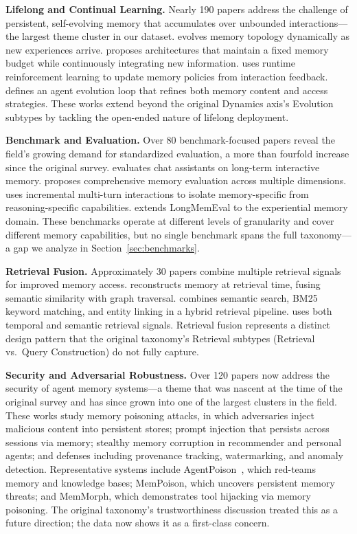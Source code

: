 \textbf{Lifelong and Continual Learning.} Nearly 190 papers address the challenge of persistent, self-evolving memory that accumulates over unbounded interactions---the largest theme cluster in our dataset. \citet{Unknown2026AllMem} evolves memory topology dynamically as new experiences arrive. \citet{Unknown2026ContinuumMemoryArchi} proposes architectures that maintain a fixed memory budget while continuously integrating new information. \citet{Unknown2026MemRL} uses runtime reinforcement learning to update memory policies from interaction feedback. \citet{Unknown2025AgentEvolver} defines an agent evolution loop that refines both memory content and access strategies. These works extend beyond the original Dynamics axis's Evolution subtypes by tackling the open-ended nature of lifelong deployment.

\textbf{Benchmark and Evaluation.} Over 80 benchmark-focused papers reveal the field's growing demand for standardized evaluation, a more than fourfold increase since the original survey. \citet{Wu2024LongMemEval} evaluates chat assistants on long-term interactive memory. \citet{Tan2025MemBench} proposes comprehensive memory evaluation across multiple dimensions. \citet{Unknown2025MemoryAgentBench} uses incremental multi-turn interactions to isolate memory-specific from reasoning-specific capabilities. \citet{Unknown2026LongMemEvalV2} extends LongMemEval to the experiential memory domain. These benchmarks operate at different levels of granularity and cover different memory capabilities, but no single benchmark spans the full taxonomy---a gap we analyze in Section~\ref{sec:benchmarks}.

\textbf{Retrieval Fusion.} Approximately 30 papers combine multiple retrieval signals for improved memory access. \citet{Unknown2026MRAgent} reconstructs memory at retrieval time, fusing semantic similarity with graph traversal. \citet{Unknown2025Mem0} combines semantic search, BM25 keyword matching, and entity linking in a hybrid retrieval pipeline. \citet{Unknown2026Engram} uses both temporal and semantic retrieval signals. Retrieval fusion represents a distinct design pattern that the original taxonomy's Retrieval subtypes (Retrieval vs.\ Query Construction) do not fully capture.

\textbf{Security and Adversarial Robustness.} Over 120 papers now address the security of agent memory systems---a theme that was nascent at the time of the original survey and has since grown into one of the largest clusters in the field. These works study memory poisoning attacks, in which adversaries inject malicious content into persistent stores; prompt injection that persists across sessions via memory; stealthy memory corruption in recommender and personal agents; and defenses including provenance tracking, watermarking, and anomaly detection. Representative systems include AgentPoison~\cite{Unknown2025AgentPoison}, which red-teams memory and knowledge bases; MemPoison, which uncovers persistent memory threats; and MemMorph, which demonstrates tool hijacking via memory poisoning. The original taxonomy's trustworthiness discussion treated this as a future direction; the data now shows it as a first-class concern.

